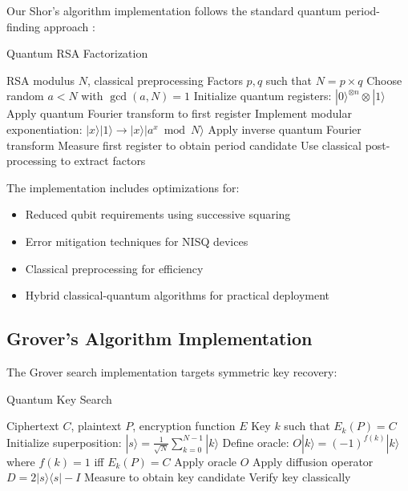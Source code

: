 \documentclass[11pt]{article}
\begin{document}
Our Shor's algorithm implementation follows the standard quantum period-finding approach \cite{shor1994algorithms}:

\begin{algorithm}
\caption{Quantum RSA Factorization}
\begin{algorithmic}[1]
\REQUIRE RSA modulus $N$, classical preprocessing
\ENSURE Factors $p, q$ such that $N = p \times q$
\STATE Choose random $a < N$ with $\gcd(a, N) = 1$
\STATE Initialize quantum registers: $|0\rangle^{\otimes n} \otimes |1\rangle$
\STATE Apply quantum Fourier transform to first register
\STATE Implement modular exponentiation: $|x\rangle|1\rangle \rightarrow |x\rangle|a^x \bmod N\rangle$
\STATE Apply inverse quantum Fourier transform
\STATE Measure first register to obtain period candidate
\STATE Use classical post-processing to extract factors
\end{algorithmic}
\end{algorithm}

The implementation includes optimizations for:
\begin{itemize}
\item Reduced qubit requirements using successive squaring
\item Error mitigation techniques for NISQ devices
\item Classical preprocessing for efficiency
\item Hybrid classical-quantum algorithms for practical deployment
\end{itemize}

\subsection{Grover's Algorithm Implementation}

The Grover search implementation targets symmetric key recovery:

\begin{algorithm}
\caption{Quantum Key Search}
\begin{algorithmic}[1]
\REQUIRE Ciphertext $C$, plaintext $P$, encryption function $E$
\ENSURE Key $k$ such that $E_k(P) = C$
\STATE Initialize superposition: $|s\rangle = \frac{1}{\sqrt{N}}\sum_{k=0}^{N-1}|k\rangle$
\STATE Define oracle: $O|k\rangle = (-1)^{f(k)}|k\rangle$ where $f(k) = 1$ iff $E_k(P) = C$
    \STATE Apply oracle $O$
    \STATE Apply diffusion operator $D = 2|s\rangle\langle s| - I$
\ENDFOR
\STATE Measure to obtain key candidate
\STATE Verify key classically
\end{algorithmic}
\end{algorithm}
\end{document}
